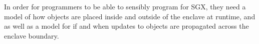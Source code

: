 In order for programmers to be able to sensibly program for SGX, they need
a model of how objects are placed inside and outside of the enclave at runtime, and as well as a model
for if and when updates to objects are propagated across the enclave boundary.






